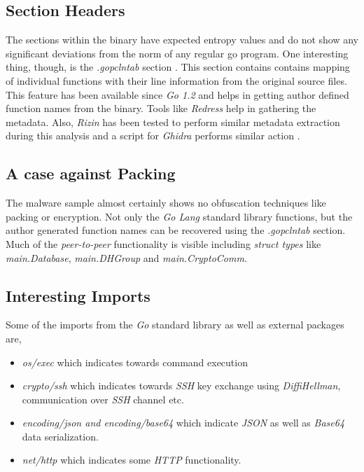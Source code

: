 \documentclass[10pt,a4paper]{article}
\begin{document}
	\subsection{Section Headers}
	The sections within the binary have expected entropy values and do not show any significant deviations from the norm of any regular go program.
	One interesting thing, though, is the \textit{.gopclntab} section \cite{pclntab}.
	This section contains contains mapping of individual functions with their line information from the original source files.
	This feature has been available since \textit{Go 1.2} and helps in getting author defined function names from the binary.
	Tools like \textit{Redress} \cite{redress} help in gathering the metadata.
	Also, \textit{Rizin} has been tested to perform similar metadata extraction during this analysis and a script for \textit{Ghidra} performs similar action \cite{gofunc}.

	\subsection{A case against Packing}
	The malware sample almost certainly shows no obfuscation techniques like packing or encryption.
	Not only the \textit{Go Lang} standard library functions, but the author generated function names can be recovered using the \textit{.gopclntab} section.
	Much of the \textit{peer-to-peer} functionality is visible including \textit{struct types} like \textit{main.Database}, \textit{main.DHGroup} and \textit{main.CryptoComm}.

	\subsection{Interesting Imports}
	Some of the imports from the \textit{Go} standard library as well as external packages are,
	\begin{itemize}
		\vspace{-0.7em}
		\item \textit{os/exec} which indicates towards command execution
		\item \textit{crypto/ssh} which indicates towards \textit{SSH} key exchange using \textit{DiffiHellman}, communication over \textit{SSH} channel etc.
		\item \textit{encoding/json and encoding/base64} which indicate \textit{JSON} as well as \textit{Base64} data serialization.
		\item \textit{net/http} which indicates some \textit{HTTP} functionality.
	\end{itemize}
\end{document}
